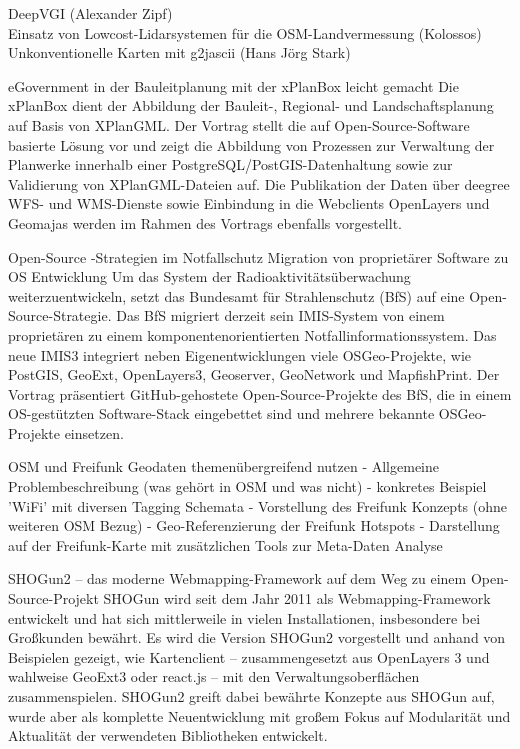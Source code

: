 %
{DeepVGI (Alexander Zipf)\\
Einsatz von Lowcost-Lidarsystemen für die OSM-Landvermessung (Kolossos)\\
Unkonventionelle Karten mit g2jascii (Hans Jörg Stark)}


%
{eGovernment in der Bauleitplanung mit der xPlanBox leicht gemacht}%
{}%
{Die xPlanBox dient der Abbildung der Bauleit-, Regional- und Landschaftsplanung auf Basis von
XPlanGML. Der Vortrag stellt die auf Open-Source-Software basierte Lösung vor und zeigt die
Abbildung von Prozessen zur Verwaltung der Planwerke innerhalb einer PostgreSQL/PostGIS-Datenhaltung
sowie zur Validierung von XPlanGML-Dateien auf. Die Publikation der Daten über deegree WFS- und
WMS-Dienste sowie Einbindung in die Webclients OpenLayers und Geomajas werden im Rahmen des Vortrags
ebenfalls vorgestellt.}

%
{Open-Source -Strategien im Notfallschutz}%
{Migration von proprietärer Software zu OS Entwicklung}%
{Um das System der Radioaktivitätsüberwachung weiterzuentwickeln, setzt das Bundesamt für
Strahlenschutz (BfS) auf eine Open-Source-Strategie. Das BfS migriert derzeit sein IMIS-System von
einem proprietären zu einem komponentenorientierten Notfallinformationssystem. Das neue IMIS3
integriert neben Eigenentwicklungen viele OSGeo-Projekte, wie PostGIS, GeoExt, OpenLayers3,
Geoserver, GeoNetwork und MapfishPrint. Der Vortrag präsentiert GitHub-gehostete
Open-Source-Projekte des BfS, die in einem OS-gestützten Software-Stack eingebettet sind und mehrere
bekannte OSGeo-Projekte einsetzen.}


%
{OSM und Freifunk}%
{Geodaten themenübergreifend nutzen}%
{- Allgemeine Problembeschreibung (was gehört in OSM und was nicht)
- konkretes Beispiel 'WiFi' mit diversen Tagging Schemata
- Vorstellung des Freifunk Konzepts (ohne weiteren OSM Bezug)
- Geo-Referenzierung der Freifunk Hotspots
- Darstellung auf der Freifunk-Karte mit zusätzlichen Tools zur Meta-Daten Analyse}


%
{SHOGun2 – das moderne Webmapping-Framework}%
{auf dem Weg zu einem Open-Source-Projekt}%
{SHOGun wird seit dem Jahr 2011 als Webmapping-Framework entwickelt und hat sich mittlerweile in
  vielen Installationen, insbesondere bei Großkunden bewährt.  Es wird die Version SHOGun2
  vorgestellt und anhand von Beispielen gezeigt, wie Kartenclient --
zusammengesetzt aus OpenLayers 3 und wahlweise GeoExt3 oder react.js -- mit den
Verwaltungsoberflächen zusammenspielen.  SHOGun2 greift dabei bewährte Konzepte aus SHOGun auf,
wurde aber als komplette Neuentwicklung mit großem Fokus auf Modularität und Aktualität der
verwendeten Bibliotheken entwickelt.}


